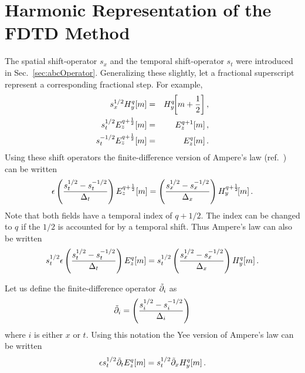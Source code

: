 \section{Harmonic Representation of the FDTD Method}

The spatial shift-operator $s_x$ and the temporal shift-operator
$s_t$ were introduced in Sec.\ \ref{sec:abcOperator}.  Generalizing
these slightly, let a fractional superscript represent a corresponding
fractional step.  For example,
\begin{eqnarray}
  s_x^{1/2}\fdtd{H_y}{m}{q} &=& \fdtdh{H_y}{m+\half}{q}, \\
  s_t^{1/2}\fdtd{E_z}{m}{q+\half} &=& \fdtd{E_z}{m}{q+1}, \\
  s_t^{-1/2}\fdtd{E_z}{m}{q+\half} &=& \fdtd{E_z}{m}{q}.
\end{eqnarray}
Using these shift operators the finite-difference version of Ampere's
law (ref.\ ) can be written
\begin{equation}
  \epsilon
  \left(\frac{s_t^{1/2} - s_t^{-1/2}}{\Delt}\right)\fdtd{E_z}{m}{q+\half}
  =
  \left(\frac{s_x^{1/2} - s_x^{-1/2}}{\Delx}\right)\fdtdh{H_y}{m}{q+\half}.
  \label{eq:ampereShift}
\end{equation}
Note that both fields have a temporal index of $q+1/2$.  The index can
be changed to $q$ if the $1/2$ is accounted for by a temporal shift.
Thus Ampere's law can also be written
\begin{equation}
  s_t^{1/2}\epsilon
  \left(\frac{s_t^{1/2} - s_t^{-1/2}}{\Delt}\right)\fdtd{E_z}{m}{q}
  =
  s_t^{1/2}
  \left(\frac{s_x^{1/2} - s_x^{-1/2}}{\Delx}\right)\fdtd{H_y}{m}{q}.
  \label{eq:ampereShiftI}
\end{equation}

Let us define the finite-difference operator $\tpartial_i$ as
\begin{equation}
  \tpartial_i = \left(\frac{s_i^{1/2} - s_i^{-1/2}}{\Delta_i}\right)
\end{equation}
where $i$ is either $x$ or $t$.  Using this notation the Yee version
of Ampere's law can be written
\begin{equation}
  \epsilon s_t^{1/2}
  \tpartial_t\fdtd{E_z}{m}{q}
  =
  s_t^{1/2}
  \tpartial_x\fdtd{H_y}{m}{q}.
  \label{eq:ampereShiftII}
\end{equation}

